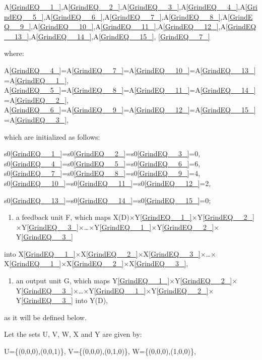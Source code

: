 \documentclass{article}
\begin{document}
A\eqref{GrindEQ__1_},A\eqref{GrindEQ__2_},A\eqref{GrindEQ__3_},A\eqref{GrindEQ__4_},A\eqref{GrindEQ__5_},A\eqref{GrindEQ__6_},A\eqref{GrindEQ__7_},A\eqref{GrindEQ__8_},A\eqref{GrindEQ__9_},A\eqref{GrindEQ__10_},A\eqref{GrindEQ__11_},A\eqref{GrindEQ__12_},A\eqref{GrindEQ__13_},A\eqref{GrindEQ__14_},A\eqref{GrindEQ__15_}, \eqref{GrindEQ__7_}

where:

A\eqref{GrindEQ__4_}=A\eqref{GrindEQ__7_}=A\eqref{GrindEQ__10_}=A\eqref{GrindEQ__13_}=A\eqref{GrindEQ__1_}, A\eqref{GrindEQ__5_}=A\eqref{GrindEQ__8_}=A\eqref{GrindEQ__11_}=A\eqref{GrindEQ__14_}=A\eqref{GrindEQ__2_}, A\eqref{GrindEQ__6_}=A\eqref{GrindEQ__9_}=A\eqref{GrindEQ__12_}=A\eqref{GrindEQ__15_}=A\eqref{GrindEQ__3_},

which are initialized as follows:

s0\eqref{GrindEQ__1_}=s0\eqref{GrindEQ__2_}=s0\eqref{GrindEQ__3_}=0, s0\eqref{GrindEQ__4_}=s0\eqref{GrindEQ__5_}=s0\eqref{GrindEQ__6_}=6, s0\eqref{GrindEQ__7_}=s0\eqref{GrindEQ__8_}=s0\eqref{GrindEQ__9_}=4, s0\eqref{GrindEQ__10_}=s0\eqref{GrindEQ__11_}=s0\eqref{GrindEQ__12_}=2,

 s0\eqref{GrindEQ__13_}=s0\eqref{GrindEQ__14_}=s0\eqref{GrindEQ__15_}=0;

\begin{enumerate}
\item  a feedback unit F, which maps X(D)$\times$Y\eqref{GrindEQ__1_}$\times$Y\eqref{GrindEQ__2_}$\times$Y\eqref{GrindEQ__3_}$\times$\dots $\times$Y\eqref{GrindEQ__1_}$\times$Y\eqref{GrindEQ__2_}$\times$Y\eqref{GrindEQ__3_}
\end{enumerate}

into X\eqref{GrindEQ__1_}$\times$X\eqref{GrindEQ__2_}$\times$X\eqref{GrindEQ__3_}$\times$\dots $\times$X\eqref{GrindEQ__1_}$\times$X\eqref{GrindEQ__2_}$\times$X\eqref{GrindEQ__3_},

\begin{enumerate}
\item  an output unit G, which maps Y\eqref{GrindEQ__1_}$\times$Y\eqref{GrindEQ__2_}$\times$Y\eqref{GrindEQ__3_}$\times$\dots $\times$Y\eqref{GrindEQ__1_}$\times$Y\eqref{GrindEQ__2_}$\times$Y\eqref{GrindEQ__3_} into Y(D),
\end{enumerate}

as it will be defined below.

Let the sets U, V, W, X and Y are given by:

U=\{(0,0,0),(0,0,1)\}, V=\{(0,0,0),(0,1,0)\}, W=\{(0,0,0),(1,0,0)\},
\end{document}
